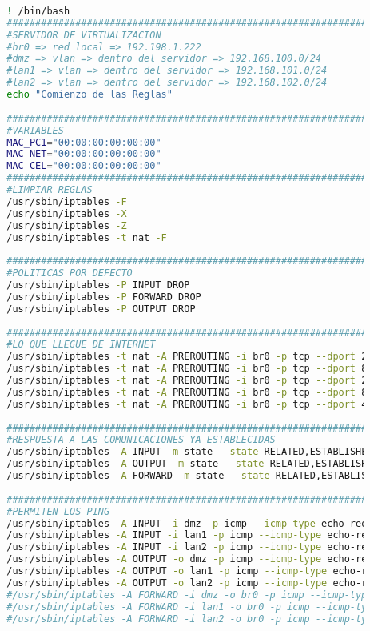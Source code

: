 		\begin{lstlisting}[language=Bash, caption=iptables]
			
		! /bin/bash
		######################################################################################################
		#SERVIDOR DE VIRTUALIZACION
		#br0 => red local => 192.198.1.222
		#dmz => vlan => dentro del servidor => 192.168.100.0/24
		#lan1 => vlan => dentro del servidor => 192.168.101.0/24
		#lan2 => vlan => dentro del servidor => 192.168.102.0/24
		echo "Comienzo de las Reglas"
		
	    ########################################################################################
		#VARIABLES
		MAC_PC1="00:00:00:00:00:00"	
		MAC_NET="00:00:00:00:00:00"	
		MAC_CEL="00:00:00:00:00:00"	
		########################################################################################
		#LIMPIAR REGLAS
		/usr/sbin/iptables -F
		/usr/sbin/iptables -X
		/usr/sbin/iptables -Z
		/usr/sbin/iptables -t nat -F
		
		########################################################################################
		#POLITICAS POR DEFECTO
		/usr/sbin/iptables -P INPUT DROP
		/usr/sbin/iptables -P FORWARD DROP
		/usr/sbin/iptables -P OUTPUT DROP
		
		########################################################################################
		#LO QUE LLEGUE DE INTERNET
		/usr/sbin/iptables -t nat -A PREROUTING -i br0 -p tcp --dport 2220 -j DNAT --to 192.168.100.2:2222
		/usr/sbin/iptables -t nat -A PREROUTING -i br0 -p tcp --dport 8096 -j DNAT --to 192.168.100.2:8096
		/usr/sbin/iptables -t nat -A PREROUTING -i br0 -p tcp --dport 2221 -j DNAT --to 192.168.100.3:2222
		/usr/sbin/iptables -t nat -A PREROUTING -i br0 -p tcp --dport 80 -j DNAT --to 192.168.100.3:80
		/usr/sbin/iptables -t nat -A PREROUTING -i br0 -p tcp --dport 443 -j DNAT --to 192.168.100.3:443
		
		########################################################################################
		#RESPUESTA A LAS COMUNICACIONES YA ESTABLECIDAS
		/usr/sbin/iptables -A INPUT -m state --state RELATED,ESTABLISHED -j ACCEPT
		/usr/sbin/iptables -A OUTPUT -m state --state RELATED,ESTABLISHED -j ACCEPT
		/usr/sbin/iptables -A FORWARD -m state --state RELATED,ESTABLISHED -j ACCEPT
		
		########################################################################################
		#PERMITEN LOS PING
		/usr/sbin/iptables -A INPUT -i dmz -p icmp --icmp-type echo-request -j ACCEPT #PING
		/usr/sbin/iptables -A INPUT -i lan1 -p icmp --icmp-type echo-request -j ACCEPT #PING
		/usr/sbin/iptables -A INPUT -i lan2 -p icmp --icmp-type echo-request -j ACCEPT #PING
		/usr/sbin/iptables -A OUTPUT -o dmz -p icmp --icmp-type echo-request -j ACCEPT #PING
		/usr/sbin/iptables -A OUTPUT -o lan1 -p icmp --icmp-type echo-request -j ACCEPT #PING
		/usr/sbin/iptables -A OUTPUT -o lan2 -p icmp --icmp-type echo-request -j ACCEPT #PING
		#/usr/sbin/iptables -A FORWARD -i dmz -o br0 -p icmp --icmp-type echo-request -j ACCEPT
		#/usr/sbin/iptables -A FORWARD -i lan1 -o br0 -p icmp --icmp-type echo-request -j ACCEPT
		#/usr/sbin/iptables -A FORWARD -i lan2 -o br0 -p icmp --icmp-type echo-request -j ACCEPT
		

\end{lstlisting}
